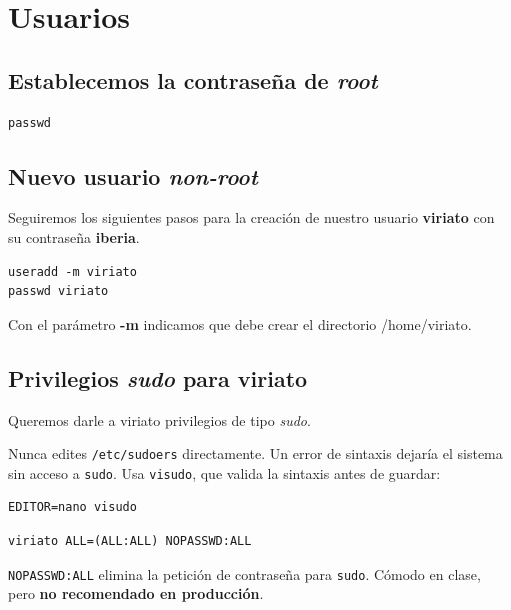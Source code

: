 \section{Usuarios}

\subsection{Establecemos la contraseña de \textit{root}}
\begin{tcolorbox}[title=Establecemos la contraseña del usuario \textit{root}]
\begin{lstlisting}[style=bashstyle]
passwd
\end{lstlisting}
\end{tcolorbox}

\subsection{Nuevo usuario \textit{non-root}}
    Seguiremos los siguientes pasos para la creación de nuestro usuario {\color{red}\textbf{viriato}} con su contraseña {\color{red}\textbf{iberia}}.
    \begin{tcolorbox}[title=Creamos el usuario y le asignamos la contraseña.]
\begin{lstlisting}[style=bashstyle]
useradd -m viriato
passwd viriato
\end{lstlisting}
\tcblower
Con el parámetro {\color{brown}\textbf{-m}} indicamos que debe crear el directorio {\ttfamily\color{red}/home/viriato}.
\end{tcolorbox}

\subsection{Privilegios \textit{sudo} para \color{blue}viriato}
		Queremos darle a {\color{brown}viriato} privilegios de tipo \textit{sudo}.

\begin{tcolorbox}[colframe=red!75!black, title=\twemoji{warning} Edición segura de sudoers con \texttt{visudo}]
  \small
  Nunca edites \texttt{/etc/sudoers} directamente. Un error de sintaxis dejaría el sistema
  sin acceso a \texttt{sudo}. Usa \texttt{visudo}, que valida la sintaxis antes de guardar:
\begin{lstlisting}[style=bashstyle]
EDITOR=nano visudo
\end{lstlisting}
\end{tcolorbox}

\begin{tcolorbox}[title=Configuración para \textbf{entorno de clase o prácticas}]
\begin{lstlisting}[style=bashstyle]
viriato ALL=(ALL:ALL) NOPASSWD:ALL
\end{lstlisting}
\tcblower
\scriptsize \texttt{NOPASSWD:ALL} elimina la petición de contraseña para \texttt{sudo}.
Cómodo en clase, pero \textbf{no recomendado en producción}.
\end{tcolorbox}

